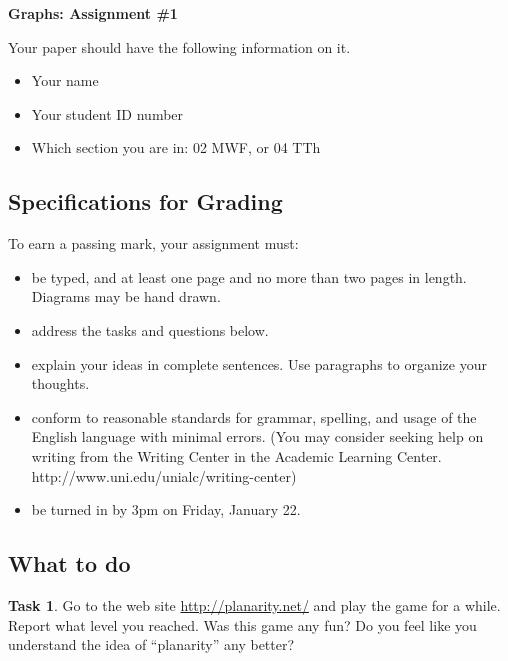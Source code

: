 \documentclass[12pt,letterpaper]{article}
\theoremstyle{definition}
\newtheorem{task}{Task}
\begin{document}
\setlength{\parskip}{1ex plus 0.5ex minus 0.2ex}
\setlength{\parindent}{0pt}

\pagestyle{fancy}
\lfoot{} 
\rfoot{} 

\begin{center}
{
\Large
\textbf{Graphs: Assignment \#1}
}
\end{center}

Your paper should have the following information on it.
\begin{itemize}
\item Your name
\item Your student ID number 
\item Which section you are in: 02 MWF, or 04 TTh
\end{itemize}


\subsection*{Specifications for Grading}

To earn a passing mark, your assignment must:
\begin{itemize}
\item be typed, and at least one page and no more than two pages in length. Diagrams may be hand drawn.
\item address the tasks and questions below.
\item explain your ideas in complete sentences. Use paragraphs to organize your thoughts.
\item conform to reasonable standards for grammar, spelling, and usage of the English language with minimal errors. (You may consider seeking help on writing from the Writing Center in the Academic Learning Center. http://www.uni.edu/unialc/writing-center)
\item be turned in by 3pm on Friday, January 22.
\end{itemize}



\subsection*{What to do}

\begin{task}
Go to the web site \url{http://planarity.net/} and play the game for a while. Report what level you reached. 
Was this game any fun? Do you feel like you understand the idea of ``planarity'' any better?
\end{task}
\end{document}
